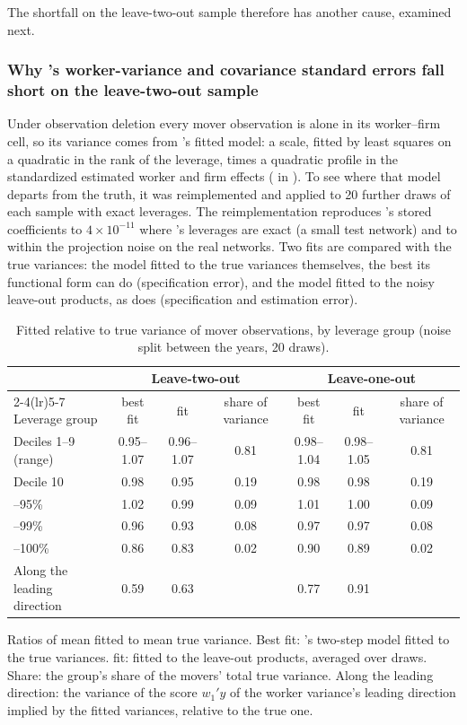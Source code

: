 The shortfall on the leave-two-out sample therefore has another cause, examined next.

\subsubsection{Why \fevc's worker-variance and covariance standard errors fall short on the leave-two-out
sample}\label{kss:sec:synth-varfit}

Under observation deletion every mover observation is alone in its worker--firm cell, so its variance comes
from \fevc's fitted model: a scale, fitted by least squares on a quadratic in the rank of the leverage, times a
quadratic profile in the standardized estimated worker and firm effects ( in
). To see where that model departs from the truth, it was reimplemented and applied
to 20 further draws of each sample with exact leverages. The reimplementation reproduces \fevc's stored
coefficients to $4\times10^{-11}$ where \fevc's leverages are exact (a small test network) and to within the
projection noise on the real networks. Two fits are compared with the true variances: the model fitted to the
true variances themselves, the best its functional form can do (specification error), and the model fitted to
the noisy leave-out products, as \fevc{} does (specification and estimation error).

\begin{table}[ht]
\centering\footnotesize\setlength{\tabcolsep}{4pt}
\caption{Fitted relative to true variance of mover observations, by leverage group (noise split between the
years, 20 draws).}\label{kss:tab:varfit}
\begin{tabular}{@{}lcccccc@{}}
\toprule
 & \multicolumn{3}{c}{Leave-two-out} & \multicolumn{3}{c}{Leave-one-out}\\
\cmidrule(lr){2-4}\cmidrule(lr){5-7}
Leverage group & best fit & \fevc{} fit & share of variance & best fit & \fevc{} fit & share of variance\\
\midrule
Deciles 1--9 (range) & 0.95--1.07 & 0.96--1.07 & 0.81 & 0.98--1.04 & 0.98--1.05 & 0.81\\
Decile 10 & 0.98 & 0.95 & 0.19 & 0.98 & 0.98 & 0.19\\
\quad 90--95\% & 1.02 & 0.99 & 0.09 & 1.01 & 1.00 & 0.09\\
\quad 95--99\% & 0.96 & 0.93 & 0.08 & 0.97 & 0.97 & 0.08\\
\quad 99--100\% & 0.86 & 0.83 & 0.02 & 0.90 & 0.89 & 0.02\\
\addlinespace
Along the leading direction & 0.59 & 0.63 & & 0.77 & 0.91 & \\
\bottomrule
\end{tabular}

\smallskip
\raggedright\footnotesize Ratios of mean fitted to mean true variance. Best fit: \fevc's two-step model fitted
to the true variances. \fevc{} fit: fitted to the leave-out products, averaged over draws. Share: the group's
share of the movers' total true variance. Along the leading direction: the variance of the score $w_1'y$ of the
worker variance's leading direction implied by the fitted variances, relative to the true one.
\end{table}

